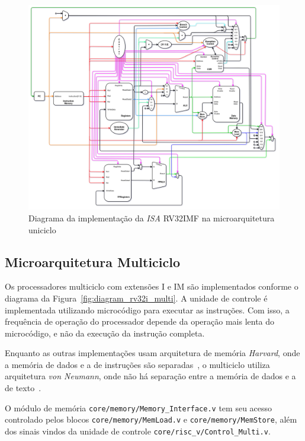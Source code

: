         \begin{figure}[H]
        \centering
            \includegraphics[angle=90,width=1\textwidth,height=1\textheight,keepaspectratio]{../images/uarch_diagrams/singlecycle-RV32IMF.png}
            \caption{Diagrama da implementação da \textit{ISA} RV32IMF na
            microarquitetura uniciclo}\label{fig:diagram_rv32imf_uni}
        \end{figure}

    \clearpage
    \subsection{Microarquitetura Multiciclo}
        { Os processadores multiciclo com extensões I e IM são implementados
            conforme o diagrama da Figura~\ref{fig:diagram_rv32i_multi}. A
            unidade de controle é implementada utilizando microcódigo para
            executar as instruções. Com isso, a frequência de operação do
            processador depende da operação mais lenta do microcódigo, e não da
            execução da instrução completa.
        }

        { Enquanto as outras implementações usam arquitetura de memória \textit{Harvard},
            onde a memória de dados e a de instruções são separadas~\cite{harvard_arch},
            o multiciclo utiliza arquitetura \textit{von Neumann}, onde não há
            separação entre a memória de dados e a de texto~\cite{von_neumann_arch}.
        }

        {
            O módulo de memória \texttt{core/memory/Memory\_Interface.v} tem seu
            acesso controlado pelos blocos \texttt{core/memory/MemLoad.v} e
            \texttt{core/memory/MemStore}, além dos sinais vindos da unidade de
            controle \texttt{core/risc\_v/Control\_Multi.v}.
        }

